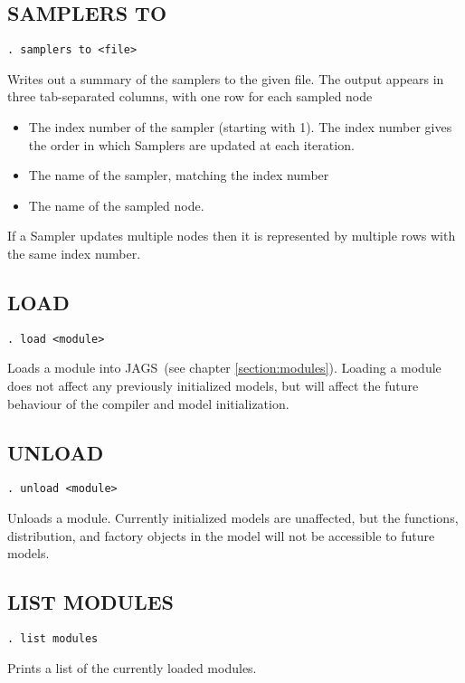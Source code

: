 \documentclass[11pt, a4paper, titlepage]{report}
\newcommand{\JAGS}{\textsf{JAGS}}
\begin{document}
\subsection{SAMPLERS TO}
\label{samplers:to}
\begin{verbatim}
. samplers to <file>
\end{verbatim}
Writes out a summary of the samplers to the given file.  The output appears
in three tab-separated columns, with one row for each sampled node
\begin{itemize}
\item The index number of the sampler (starting with 1). The index number 
gives the order in which Samplers are updated at each iteration.
\item The name of the sampler, matching the index number
\item The name of the sampled node. 
\end{itemize}
If a Sampler updates multiple nodes then it is represented by multiple rows
with the same index number.

\subsection{LOAD}
\label{load}
\begin{verbatim}
. load <module>
\end{verbatim}
Loads a module into \JAGS\ (see chapter \ref{section:modules}). Loading
a module does not affect any previously initialized models, but will
affect the future behaviour of the compiler and model initialization.

\subsection{UNLOAD}
\label{unload}
\begin{verbatim}
. unload <module>
\end{verbatim}
Unloads a module. Currently initialized models are unaffected, but
the functions, distribution, and factory objects in the model will not
be accessible to future models.

\subsection{LIST MODULES}
\label{list:modules}
\begin{verbatim}
. list modules
\end{verbatim}
Prints a list of the currently loaded modules.
\end{document}
